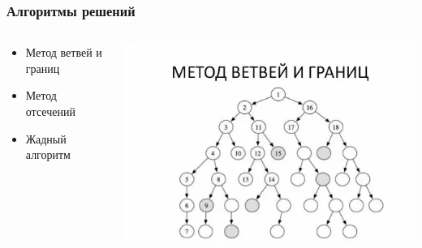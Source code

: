 \documentclass[12pt]{beamer}
\begin{document}
    \begin{frame}
        \frametitle{Алгоритмы решений}
    
        \begin{columns}
            \begin{column}{0.5\textwidth}
                \begin{itemize}
                    \item Метод ветвей и границ
                    \item Метод отсечений
                    \item Жадный алгоритм
                \end{itemize}
            \end{column}
            \begin{column}{0.5\textwidth}
                \includegraphics[width=1\textwidth]{vetvi.png}
            \end{column}
        \end{columns}
    
    \end{frame}
\end{document}

